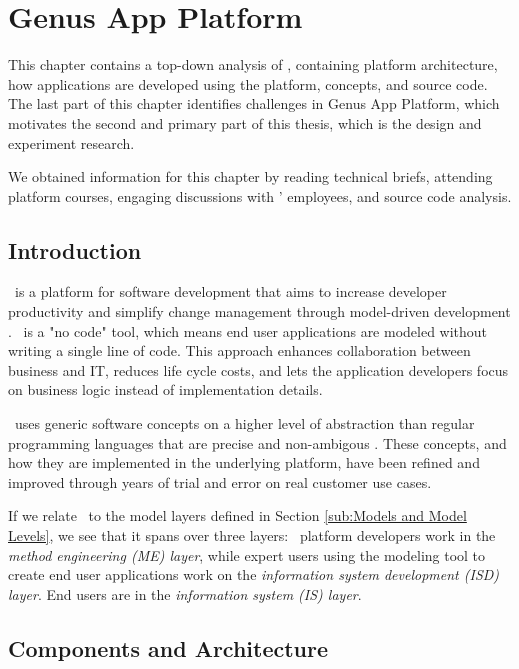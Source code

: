 \chapter{Genus App Platform}
\label{chap:gap}

This chapter contains a top-down analysis of \gap, containing platform architecture, how applications are developed using the platform, concepts, and source code. The last part of this chapter identifies challenges in Genus App Platform, which motivates the second and primary part of this thesis, which is the design and experiment research.

We obtained information for this chapter by reading technical briefs, attending platform courses, engaging discussions with \genus' employees, and source code analysis.


\clearpage
\section{Introduction}
\label{sec:Introduction}


\gap~is a platform for software development that aims to increase developer productivity and simplify change management through model-driven development \cite{Genus_AS2016-kt}. \gap~is a "no code" tool, which means end user applications are modeled without writing a single line of code. This approach enhances collaboration between business and IT, reduces life cycle costs, and lets the application developers focus on business logic instead of implementation details. 

\gap~uses generic software concepts on a higher level of abstraction than regular programming languages that are precise and non-ambigous \cite{noauthor_undated-qy}. These concepts, and how they are implemented in the underlying platform, have been refined and improved through years of trial and error on real customer use cases.

If we relate \gap~to the model layers defined in Section \ref{sub:Models and Model Levels}, we see that it spans over three layers: \gap~platform developers work in the \textit{method engineering (ME) layer}, while expert users using the modeling tool to create end user applications work on the \textit{information system development (ISD) layer}. End users are in the \textit{information system (IS) layer}.

\section{Components and Architecture}
\label{sec:Components and Architecture}


